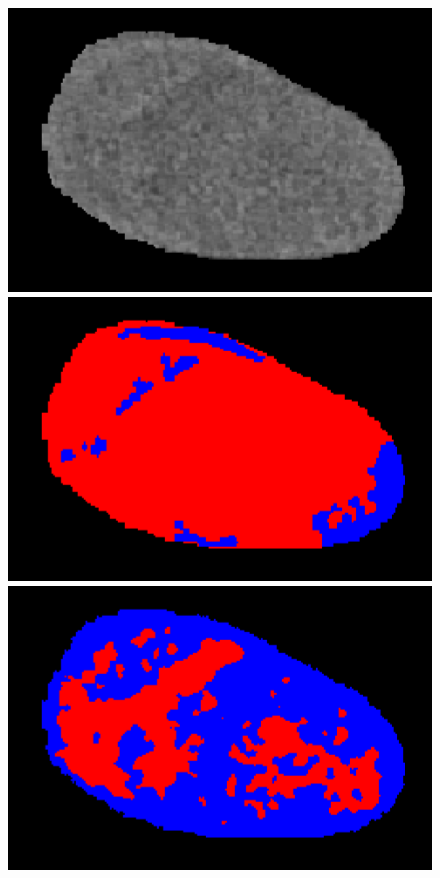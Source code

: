 \begin{figure}[!ht]
	\centering
	\begin{minipage}{4cm}
		\includegraphics[width=\linewidth]{images/NecrosisVE_Raw_Pat0_8_crop}
	\end{minipage} \hspace{-0.3cm}
	\begin{minipage}{4cm}
		\includegraphics[width=\linewidth]{images/NecrosisVE_GT_Pat0_8_crop}
	\end{minipage} \hspace{-0.3cm}
	\begin{minipage}{4cm}
		\includegraphics[width=\linewidth]{images/NecrosisVE_Pred_Pat0_8_crop}

\end{minipage}
\end{figure}
